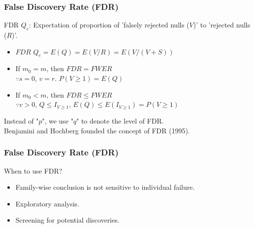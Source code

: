 \documentclass{beamer}
\begin{document}
\frame
{
  \frametitle{\LARGE{False Discovery Rate (FDR)}}
    \normalsize
    FDR $Q_e$: Expectation of proportion of 'falsely rejected nulls ($V$)' to 'rejected nulls ($R$)'. \vspace{0.1in}\\
    \begin{itemize}
      \item $FDR$ $Q_e=E(Q)=E(V/R)=E(V/(V+S))$ \vspace{0.1in}\\
      \item If $m_0=m$, then $FDR=FWER$\\
        $\because s=0$, $v=r$. $P(V \geq 1)= E(Q)$\vspace{0.1in}\\
      \item If $m_0<m$, then $FDR \leq FWER$\\
        $\because v>0$, $Q \leq I_{V \geq 1}$, $E(Q) \leq E(I_{V \geq 1}) = P(V \geq 1)$ \vspace{0.2in}\\
    \end{itemize}
    Instead of "$p$", we use "$q$" to denote the level of FDR.\vspace{0.1in}\\
    Benjamini and Hochberg founded the concept of FDR (1995). 
}


\frame
{
  \frametitle{\LARGE{False Discovery Rate (FDR)}}
    \begin{block}{When to use FDR?}
    $ $ \vspace{0.05in}\\
    \begin{itemize}
      \item Family-wise conclusion is not sensitive to individual failure. \vspace{0.1in}\\
      \item Exploratory analysis. \vspace{0.1in}\\
      \item Screening for potential discoveries. \\
    \end{itemize}
    \end{block}
}
\end{document}
